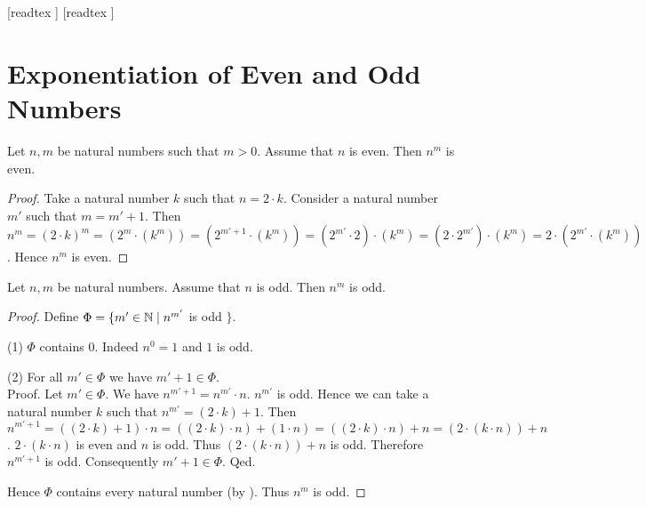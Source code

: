 \documentclass[10pt]{article}
\begin{document}
  \begin{imports}
    \begin{forthel}
      [readtex ]
      [readtex ]
    \end{forthel}
  \end{imports}


  \section*{Exponentiation of Even and Odd Numbers}

  \begin{forthel}
    \begin{proposition}
      Let $n, m$ be natural numbers such that $m > 0$.
      Assume that $n$ is even.
      Then $n^{m}$ is even.
    \end{proposition}
    \begin{proof}
      Take a natural number $k$ such that $n = 2 \cdot k$.
      Consider a natural number $m'$ such that $m = m' + 1$.
      Then $n^{m}
        = (2 \cdot k)^{m}
        = (2^{m} \cdot (k^{m}))
        = (2^{m' + 1} \cdot (k^{m}))
        = (2^{m'} \cdot 2) \cdot (k^{m})
        = (2 \cdot 2^{m'}) \cdot (k^{m})
        = 2 \cdot (2^{m'} \cdot (k^{m}))$.
      Hence $n^{m}$ is even.
    \end{proof}
  \end{forthel}

  \begin{forthel}
    \begin{proposition}
      Let $n, m$ be natural numbers.
      Assume that $n$ is odd.
      Then $n^{m}$ is odd.
    \end{proposition}
    \begin{proof}
      Define $\Phi = \{ m' \in \mathbb{N} \mid n^{m'}$ is odd $\}$.

      (1) $\Phi$ contains $0$.
      Indeed $n^{0} = 1$ and $1$ is odd.

      (2) For all $m' \in \Phi$ we have $m' + 1 \in \Phi$. \\
      Proof.
        Let $m' \in \Phi$.
        We have $n^{m' + 1} = n^{m'} \cdot n$.
        $n^{m'}$ is odd.
        Hence we can take a natural number $k$ such that $n^{m'} = (2 \cdot k) + 1$.
        Then $n^{m' + 1}
          = ((2 \cdot k) + 1) \cdot n
          = ((2 \cdot k) \cdot n) + (1 \cdot n)
          = ((2 \cdot k) \cdot n) + n
          = (2 \cdot (k \cdot n)) + n$.
        $2 \cdot (k \cdot n)$ is even and $n$ is odd.
        Thus $(2 \cdot (k \cdot n)) + n$ is odd.
        Therefore $n^{m' + 1}$ is odd.
        Consequently $m' + 1 \in \Phi$.
      Qed.

      Hence $\Phi$ contains every natural number (by ).
      Thus $n^{m}$ is odd.
    \end{proof}
  \end{forthel}
\end{document}
